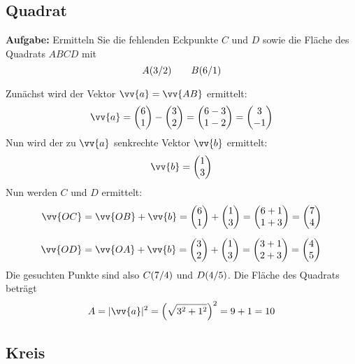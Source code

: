 \newpage
\subsection{Quadrat}

\textbf{Aufgabe:} Ermitteln Sie die fehlenden Eckpunkte $C$ und $D$ sowie die Fläche des Quadrats $ABCD$ mit
\[
  \pxy[A]{3,2} \qquad \pxy[B]{6,1}
\]
\begin{center}
\end{center}
Zunächst wird der Vektor $\vv{a} = \vv{AB}$ ermittelt:
\[
  \vv{a} = \vxy{6,1}-\vxy{3,2} = \vxy{6-3,1-2} = \vxy{3,-1}
\]
Nun wird der zu $\vv{a}$ senkrechte Vektor $\vv{b}$ ermittelt:
\[
  \vv{b} = \vxy{1,3}
\]
Nun werden $C$ und $D$ ermittelt:
\begin{align*}
  \vv{OC} &= \vv{OB}+\vv{b} = \vxy{6,1} + \vxy{1,3} = \vxy{6+1,1+3} = \vxy{7,4} \\[2mm]
  \vv{OD} &= \vv{OA}+\vv{b} = \vxy{3,2} + \vxy{1,3} = \vxy{3+1,2+3} = \vxy{4,5}
\end{align*}
Die gesuchten Punkte sind also $\pxy[C]{7,4}$ und $\pxy[D]{4,5}$. Die Fläche des Quadrats beträgt
\[
  A = |\vv{a}|^{2} = \left(\sqrt{3^{2}+1^{2}}\right)^{2} = 9+1 = 10
\]

\newpage
\subsection{Kreis}

